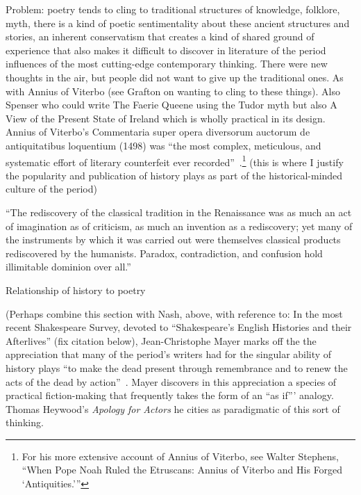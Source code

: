 Problem: poetry tends to cling to traditional structures of knowledge, folklore, myth, there is a kind of poetic sentimentality about these ancient structures and stories, an inherent conservatism that creates a kind of shared ground of experience that also makes it difficult to discover in literature of the period influences of the most cutting-edge contemporary thinking. There were new thoughts in the air, but people did not want to give up the traditional ones. As with Annius of Viterbo (see Grafton on wanting to cling to these things). Also Spenser who could write The Faerie Queene using the Tudor myth but also A View of the Present State of Ireland which is wholly practical in its design.
Annius of Viterbo's Commentaria super opera diversorum auctorum de antiquitatibus loquentium (1498) was ``the most complex, meticulous, and systematic effort of literary counterfeit ever recorded''~\cite[102]{stephens_giants_1989}.\footnote{For his more extensive account of Annius of Viterbo, see Walter Stephens, ``When Pope Noah Ruled the Etruscans: Annius of Viterbo and His Forged `Antiquities.'''\nocite{stephens_when_2004}}
(this is where I justify the popularity and publication of history plays as part of the historical-minded culture of the period)

``The rediscovery of the classical tradition in the Renaissance was as much an act of imagination as of criticism, as much an invention as a rediscovery; yet many of the instruments by which it was carried out were themselves classical products rediscovered by the humanists. Paradox, contradiction, and confusion hold illimitable dominion over all.''~\cite[103]{grafton_defenders_1991}

Relationship of history to poetry

(Perhaps combine this section with Nash, above, with reference to: In the most recent Shakespeare Survey, devoted to ``Shakespeare's English Histories and their Afterlives'' (fix citation below), Jean-Christophe Mayer marks off the the appreciation that many of the period's writers had for the singular ability of history plays ``to make the dead present through remembrance and to renew the acts of the dead by action''~\cite[20]{mayer_decline_2010}. Mayer discovers in this appreciation a species of practical fiction-making that frequently takes the form of an ``as if''' analogy. Thomas Heywood's \emph{Apology for Actors} he cities as paradigmatic of this sort of thinking.

